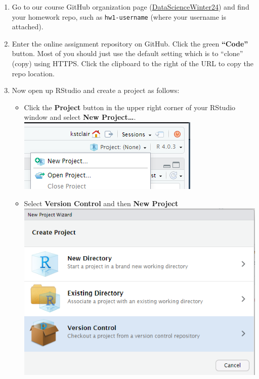 \documentclass[
]{book}
\providecommand{\tightlist}{%
  \setlength{\itemsep}{0pt}\setlength{\parskip}{0pt}}
\begin{document}
\begin{enumerate}
\def\labelenumi{\arabic{enumi}.}
\item
  Go to our course GitHub organization page
  (\href{https://github.com/DataScienceWinter24}{DataScienceWinter24}) and find your homework repo, such as \texttt{hw1-username} (where your username is attached).
\item
  Enter the online assignment repository on GitHub. Click the green
  \textbf{``Code''} button. Most of you should just use the default setting
  which is to ``clone'' (copy) using HTTPS. Click the clipboard to the
  right of the URL to copy the repo location.
\item
  Now open up RStudio and create a project as follows:

  \begin{itemize}
  \tightlist
  \item
    Click the \textbf{Project} button in the upper right corner of your RStudio window and select \textbf{New Project\ldots{}}.
    \includegraphics{img/maize_project.png}
  \item
    Select \textbf{Version Control} and then \textbf{New Project}
    \includegraphics{img/maize_version.png}

\end{itemize}
\end{enumerate}
\end{document}
